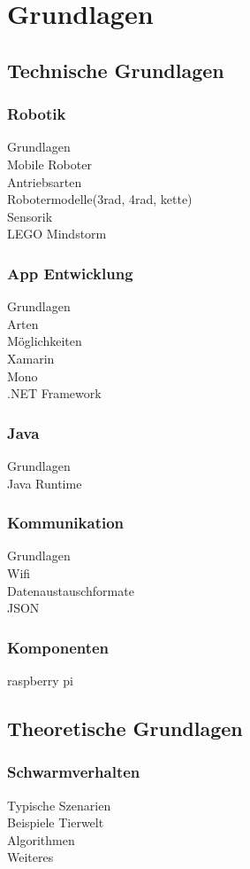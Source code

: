 \section{Grundlagen}
\subsection{Technische Grundlagen}
\subsubsection{Robotik}
Grundlagen\\
Mobile Roboter\\
Antriebsarten\\
Robotermodelle(3rad, 4rad, kette)\\
Sensorik\\
LEGO Mindstorm\\
\subsubsection{App Entwicklung}
Grundlagen\\
Arten\\
Möglichkeiten\\
Xamarin\\
Mono\\
.NET Framework\\
\subsubsection{Java}
Grundlagen\\
Java Runtime\\
\subsubsection{Kommunikation}
Grundlagen\\
Wifi\\
Datenaustauschformate\\
JSON\\
\subsubsection{Komponenten}
raspberry pi\\

\subsection{Theoretische Grundlagen}
\subsubsection{Schwarmverhalten}
Typische Szenarien\\
Beispiele Tierwelt\\
Algorithmen\\
Weiteres